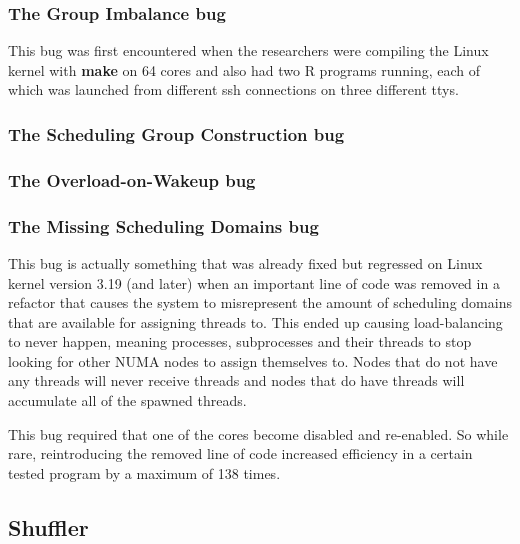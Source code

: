 \documentclass{sig-alternate}
\begin{document}
\subsubsection{The Group Imbalance bug}
\label{sec:cfsfault_grpimbalance}

This bug was first encountered when the researchers were compiling the Linux kernel with \textbf{make} on 64 cores and also had two R programs running, each of which was launched from different ssh connections on three different ttys. ~\cite{Lozi:2016}

\subsubsection{The Scheduling Group Construction bug}
\label{sec:cfsfault_grpconstruct}



\subsubsection{The Overload-on-Wakeup bug}
\label{sec:cfsfault_overload}

\subsubsection{The Missing Scheduling Domains bug}
\label{sec:cfsfault_missingsched}

This bug is actually something that was already fixed but regressed on Linux kernel version 3.19 (and later) when an important line of code was removed in a refactor that causes the system to misrepresent the amount of scheduling domains that are available for assigning threads to. This ended up causing load-balancing to never happen, meaning processes, subprocesses and their threads to stop looking for other NUMA nodes to assign themselves to. Nodes that do not have any threads will never receive threads and nodes that do have threads will accumulate all of the spawned threads.

This bug required that one of the cores become disabled and re-enabled. So while rare, reintroducing the removed line of code increased efficiency in a certain tested program by a maximum of 138 times.~\cite{Lozi:2016}

\subsection{Shuffler}
\label{sec:shuffler}

\end{document}
